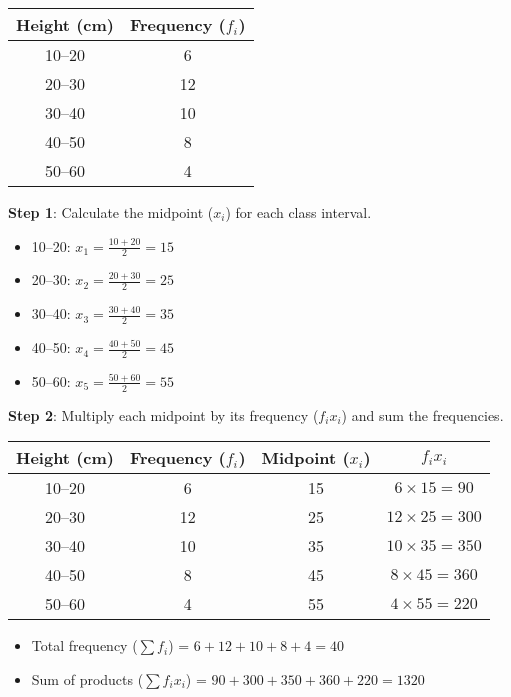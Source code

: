 \documentclass[11pt]{article}
\begin{document}
\begin{center}
\begin{tabular}{|c|c|}
\hline
\textbf{Height (cm)} & \textbf{Frequency} ($f_i$) \\
\hline
10--20 & 6 \\
20--30 & 12 \\
30--40 & 10 \\
40--50 & 8 \\
50--60 & 4 \\
\hline
\end{tabular}
\end{center}

\textbf{Step 1}: Calculate the midpoint ($x_i$) for each class interval.
\begin{itemize}
    \item 10--20: $x_1 = \frac{10 + 20}{2} = 15$
    \item 20--30: $x_2 = \frac{20 + 30}{2} = 25$
    \item 30--40: $x_3 = \frac{30 + 40}{2} = 35$
    \item 40--50: $x_4 = \frac{40 + 50}{2} = 45$
    \item 50--60: $x_5 = \frac{50 + 60}{2} = 55$
\end{itemize}

\textbf{Step 2}: Multiply each midpoint by its frequency ($f_i x_i$) and sum the frequencies.

\begin{center}
\begin{tabular}{|c|c|c|c|}
\hline
\textbf{Height (cm)} & \textbf{Frequency} ($f_i$) & \textbf{Midpoint} ($x_i$) & $f_i x_i$ \\
\hline
10--20 & 6 & 15 & $6 \times 15 = 90$ \\
20--30 & 12 & 25 & $12 \times 25 = 300$ \\
30--40 & 10 & 35 & $10 \times 35 = 350$ \\
40--50 & 8 & 45 & $8 \times 45 = 360$ \\
50--60 & 4 & 55 & $4 \times 55 = 220$ \\
\hline
\end{tabular}
\end{center}

\begin{itemize}
    \item Total frequency ($\sum f_i$) = $6 + 12 + 10 + 8 + 4 = 40$
    \item Sum of products ($\sum f_i x_i$) = $90 + 300 + 350 + 360 + 220 = 1320$
\end{itemize}
\end{document}
